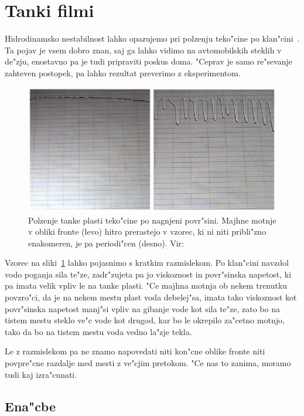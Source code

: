 \documentclass[a4paper,10pt]{article}
\begin{document}
\section{Tanki filmi}

Hidrodinamsko nestabilnost lahko opazujemo pri polzenju teko"cine po klan"cini~\cite{kondic}. Ta pojav je vsem dobro znan, saj ga lahko vidimo na avtomobilskih steklih v de"zju, enostavno pa je tudi pripraviti poskus doma. "Ceprav je samo re"sevanje zahteven postopek, pa lahko rezultat preverimo z eksperimentom. 

\begin{figure}[h]
\centering
 \includegraphics[width=.9\textwidth]{./Slike/film-slika}
\caption{Polzenje tanke plasti teko"cine po nagnjeni povr"sini. Majhne motnje v obliki fronte (levo) hitro prerastejo v vzorec, ki ni niti pribli"zno enakomeren, je pa periodi"cen (desno). Vir: \cite{kondic}}
\label{fig:film-neenakomernost}
\end{figure}

Vzorec na sliki~\ref{fig:film-neenakomernost} lahko pojasnimo s kratkim razmislekom. Po klan"cini navzdol vodo poganja sila te"ze, zadr"zujeta pa jo viskoznost in povr"sinska napetost, ki pa imata velik vpliv le na tanke plasti. "Ce majhna motnja ob nekem trenutku povzro"ci, da je na nekem mestu plast voda debelej"sa, imata tako viskoznost kot povr"sinska napetost manj"si vpliv na gibanje vode kot sila te"ze, zato bo na tistem mestu steklo ve"c vode kot drugod, kar bo le okrepilo za"cetno motnjo, tako da bo na tistem mestu voda vedno la"zje tekla. 

Le z razmislekom pa ne znamo napovedati niti kon"cne oblike fronte niti povpre"cne razdalje med mesti z ve"cjim pretokom. "Ce nas to zanima, moramo tudi kaj izra"cunati. 

\subsection{Ena"cbe}
\end{document}
